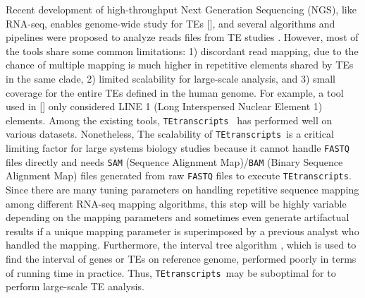 \documentclass[wsdraft]{ws-procs11x85}
\newcommand{\TEtranscripts}{\texttt{TEtranscripts}}
\begin{document}
Recent development of high-throughput Next Generation Sequencing (NGS), like RNA-seq,
enables genome-wide study for TEs [], and several algorithms and pipelines were proposed to analyze reads files from TE studies \cite{lee2012landscape,platzer2012te,helman2014somatic,henaff2015jitterbug,jin2015tetranscripts,de2017identifying,tang2017human}. However, most of the tools share some common limitations: 1) discordant read mapping, due to the chance of multiple mapping is much higher in
repetitive
elements shared by TEs in the same clade, 2) limited scalability for large-scale analysis, and 3) small coverage for the entire TEs defined in the human genome. For example, a tool used in [] only considered LINE 1 (Long Interspersed Nuclear Element 1) elements.
% 
% 
% 
%
\cite{ewing2015transposable} 
Among the existing tools, \TEtranscripts~ has performed well on various datasets.
% 
% 
\cite{jin2015tetranscripts}
Nonetheless, The scalability of \TEtranscripts~is a critical limiting factor for large systems biology studies because it cannot handle \verb|FASTQ| files directly and needs \verb|SAM| (Sequence Alignment Map)/\verb|BAM| (Binary Sequence Alignment Map) files generated from raw \verb|FASTQ| files to execute \TEtranscripts. Since there are many tuning parameters on handling repetitive sequence mapping among different RNA-seq mapping algorithms, this step will be highly variable depending on the mapping parameters and sometimes even generate artifactual results if a unique mapping parameter is superimposed by a previous analyst who handled the mapping. 
Furthermore, the interval tree algorithm \cite{samet1990design}, which is used to find the interval of genes or TEs on reference genome,  performed poorly in terms of running time in practice. Thus, \TEtranscripts~may be suboptimal for to perform large-scale TE analysis.
\end{document}
